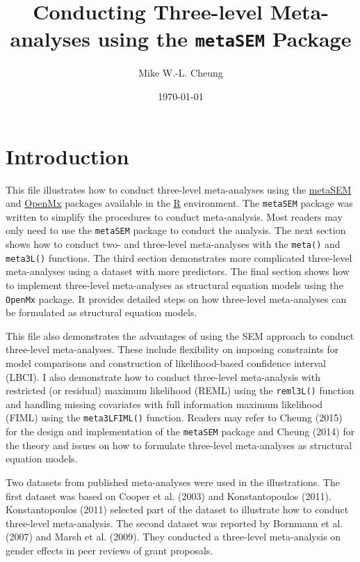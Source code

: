 \documentclass[11pt]{article}
\author{Mike W.-L. Cheung}
\date{\today}
\title{Conducting Three-level Meta-analyses using the \texttt{metaSEM} Package}
\begin{document}
\maketitle
\tableofcontents


\section{Introduction}
\label{sec:orgab8a2d7}
This file illustrates how to conduct three-level meta-analyses using the \href{https://cran.r-project.org/package=metaSEM}{metaSEM} and \href{https://openmx.ssri.psu.edu}{OpenMx} packages available in the \href{https://www.r-project.org/}{R} environment. The \texttt{metaSEM} package was written to simplify the procedures to conduct meta-analysis. Most readers may only need to use the \texttt{metaSEM} package to conduct the analysis. The next section shows how to conduct two- and three-level meta-analyses with the \texttt{meta()} and \texttt{meta3L()} functions. The third section demonstrates more complicated three-level meta-analyses using a dataset with more predictors. The final section shows how to implement three-level meta-analyses as structural equation models using the \texttt{OpenMx} package. It provides detailed steps on how three-level meta-analyses can be formulated as structural equation models.

This file also demonstrates the advantages of using the SEM approach to conduct three-level meta-analyses. These include flexibility on imposing constraints for model comparisons and construction of likelihood-based confidence interval (LBCI). I also demonstrate how to conduct three-level meta-analysis with restricted (or residual) maximum likelihood (REML) using the \texttt{reml3L()} function and handling missing covariates with full information maximum likelihood (FIML) using the \texttt{meta3LFIML()} function. Readers may refer to Cheung (2015) for the design and implementation of the \texttt{metaSEM} package and Cheung (2014) for the theory and issues on how to formulate three-level meta-analyses as structural equation models. 

Two datasets from published meta-analyses were used in the illustrations. The first dataset was based on Cooper et al. (2003) and Konstantopoulos (2011). Konstantopoulos (2011) selected part of the dataset to illustrate how to conduct three-level meta-analysis. The second dataset was reported by Bornmann et al. (2007) and Marsh et al. (2009). They conducted a three-level meta-analysis on gender effects in peer reviews of grant proposals. 
\end{document}
